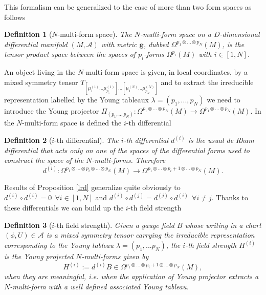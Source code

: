 \documentclass[a4paper,12pt]{article}
\newtheorem{Definition}{Definition}[section]
\begin{document}
This formalism can be generalized to the case of more than two form spaces as follows
\begin{Definition}[$N$-multi-form space]
    \textit{The $N$-multi-form space on a $D$-dimensional differential manifold $(M,\mathcal{A})$ with metric $\boldsymbol{g}$, dubbed $\Omega^{p_1 \otimes ... \otimes p_N}(M)$, is the tensor product space between the spaces of $p_i$-forms $\Omega^{p_i}(M)$ with $i \in [1,N]$.}
\end{Definition}
An object living in the $N$-multi-form space is given, in local coordinates, by a mixed symmetry tensor $T_{[\mu_1^{(1)}...\mu_{p_1}^{(1)}]...[\mu_1^{(N)}...\mu_{p_N}^{(N)}]}$ and to extract the irreducible representation labelled
by the Young tableaux $\lambda=(p_1,...,p_N)$ we need to introduce the Young projector $\Pi_{(p_1,..,p_N)} : \Omega^{p_1 \otimes ... \otimes p_N}(M) \rightarrow \Omega^{p_1 \otimes ... \otimes p_N}(M)$. In the $N$-multi-form space is defined the $i$-th differential
\begin{Definition}[$i$-th differential]
    \textit{The $i$-th differential $d^{(i)}$ is the usual de Rham differential that acts only on one of the spaces of the differential forms used to construct the space of the $N$-multi-forms. Therefore}
    \begin{equation}
        d^{(i)}: \Omega^{p_1 \otimes ... \otimes p_i \otimes ... \otimes p_N}(M) \rightarrow  \Omega^{p_1 \otimes ... \otimes p_i+1 \otimes ... \otimes p_N}(M).
    \end{equation}
\end{Definition}
Results of Proposition \ref{lrd} generalize quite obviously to $d^{(i)} \circ d^{(i)}=0 \ \ \forall i \in [1,N]$ and $d^{(i)} \circ d^{(j)}=d^{(j)} \circ d^{(i)} \ \ \forall i \neq j.$ Thanks to these differentials we can build up the $i$-th field strength
\begin{Definition}[$i$-th field strength]
    \textit{Given a gauge field $B$ whose writing in a chart $(\phi,U) \in \mathcal{A}$ is a mixed symmetry tensor carrying the irreducible representation corresponding to the Young tableau $\lambda=(p_1,...p_N)$, the $i$-th field strength $H^{(i)}$ is the Young projected $N$-multi-forms given by}
    \begin{equation}
        H^{(i)}:=d^{(i)} B \in \Omega^{p_1 \otimes ... \otimes p_i+1 \otimes ... \otimes p_N}(M),
    \end{equation}
    \textit{when they are meaningful, i.e. when the application of Young projector extracts a $N$-multi-form with a well defined associated Young tableau.}
\end{Definition}
\end{document}
